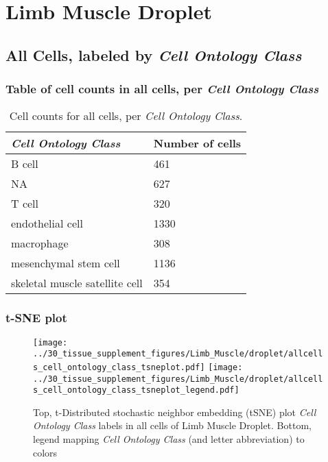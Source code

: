 \clearpage
\section{Limb Muscle Droplet}

\subsection{All Cells, labeled by \emph{Cell Ontology Class}}
\subsubsection{Table of cell counts in all cells, per \emph{Cell Ontology Class}}\begin{table}[h]
\centering
\label{my-label}
\begin{tabular}{@{}ll@{}}
\toprule

\emph{Cell Ontology Class}& Number of cells \\ \midrule
B cell & 461 \\

NA & 627 \\

T cell & 320 \\

endothelial cell & 1330 \\

macrophage & 308 \\

mesenchymal stem cell & 1136 \\

skeletal muscle satellite cell & 354 \\
\bottomrule
\end{tabular}
\caption{Cell counts for all cells, per \emph{Cell Ontology Class}.}
\end{table}

\clearpage
\subsubsection{t-SNE plot}
\begin{figure}[h]
\centering
\texttt{[image: ../30\_tissue\_supplement\_figures/Limb\_Muscle/droplet/allcells\_cell\_ontology\_class\_tsneplot.pdf]}
\texttt{[image: ../30\_tissue\_supplement\_figures/Limb\_Muscle/droplet/allcells\_cell\_ontology\_class\_tsneplot\_legend.pdf]}
\caption{Top, t-Distributed stochastic neighbor embedding (tSNE) plot  \emph{Cell Ontology Class} labels in all cells of Limb Muscle Droplet. Bottom, legend mapping \emph{Cell Ontology Class} (and letter abbreviation) to colors}
\end{figure}


